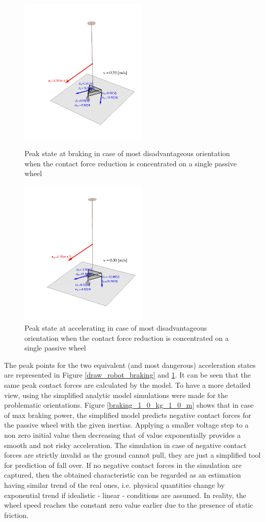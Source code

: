 \documentclass[12pt,english,twoside]{article}
\begin{document}
\begin{figure}[htb!]
	\centering
	\includegraphics[height=7cm]{figures/draw_robot_baking}
	\caption{Peak state at braking in case of most disadvantageous orientation when the contact force reduction is concentrated on a single passive wheel}
	\label{draw_robot_braking}
	\endminipage\hfill
	\centering
	\includegraphics[height=7cm]{figures/draw_robot_accelerating}
	\caption{Peak state at accelerating in case of most disadvantageous orientation when the contact force reduction is concentrated on a single passive wheel}
	\label{draw_robot_accelerate}
	\endminipage\hfill
\end{figure}
The peak points for the two equivalent (and most dangerous) acceleration states are represented in Figure \ref{draw_robot_braking} and \ref{draw_robot_accelerate}. It can be seen that the same peak contact forces are calculated by the model. To have a more detailed view, using the simplified analytic model simulations were made for the problematic orientations.
Figure \ref{braking_1_0_kg_1_0_m} shows that in case of max braking power, the simplified model predicts negative contact forces for the passive wheel with the given inertias. Applying a smaller voltage step to a non zero initial value then decreasing that of value exponentially provides a smooth and not risky acceleration. The simulation in case of negative contact forces are strictly invalid as the ground cannot pull, they are just a simplified tool for prediction of fall over. If no negative contact forces in the simulation are captured, then the obtained characteristic can be regarded as an estimation having similar trend of the real ones, i.e. physical quantities change by exponential trend if idealistic - linear - conditions are assumed. In reality, the wheel speed reaches the constant zero value earlier due to the presence of static friction.
\end{document}

